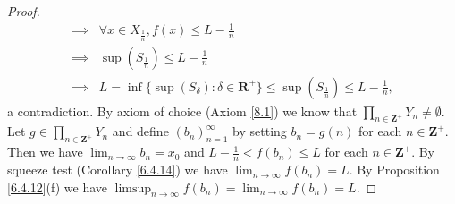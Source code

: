\begin{proof}
\begin{align*}
        \implies & \forall x \in X_{\frac{1}{n}}, f(x) \leq L - \frac{1}{n}                                                \\
        \implies & \sup(S_{\frac{1}{n}}) \leq L - \frac{1}{n}                                                              \\
        \implies & L = \inf\{\sup(S_{\delta}) : \delta \in \mathbf{R}^+\} \leq \sup(S_{\frac{1}{n}}) \leq L - \frac{1}{n},
    \end{align*}
    a contradiction.
    By axiom of choice (Axiom \ref{8.1}) we know that \(\prod_{n \in \mathbf{Z}^+} Y_n \neq \emptyset\).
    Let \(g \in \prod_{n \in \mathbf{Z}^+} Y_n\) and define \((b_n)_{n = 1}^\infty\) by setting \(b_n = g(n)\) for each \(n \in \mathbf{Z}^+\).
    Then we have \(\lim_{n \to \infty} b_n = x_0\) and \(L - \frac{1}{n} < f(b_n) \leq L\) for each \(n \in \mathbf{Z}^+\).
    By squeeze test (Corollary \ref{6.4.14}) we have \(\lim_{n \to \infty} f(b_n) = L\).
    By Proposition \ref{6.4.12}(f) we have \(\limsup_{n \to \infty} f(b_n) = \lim_{n \to \infty} f(b_n) = L\).


\end{proof}
